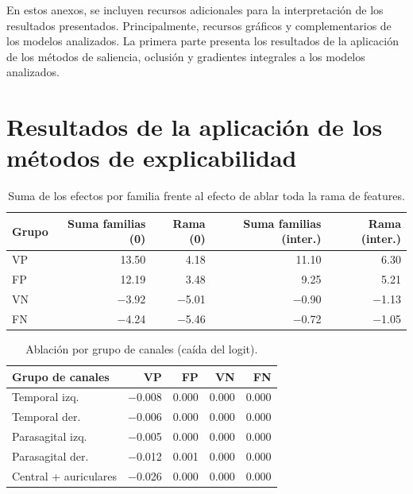 En estos anexos, se incluyen recursos adicionales para la interpretación de los resultados presentados. Principalmente, recursos gráficos y complementarios de los modelos analizados. La primera parte presenta los resultados de la aplicación de los métodos de saliencia, oclusión y gradientes integrales a los modelos analizados.

\section{Resultados de la aplicación de los métodos de explicabilidad}


\begin{table}[htbp]
\centering
\small
\caption{Suma de los efectos por familia frente al efecto de ablar toda la rama de features.}
\label{tab:aditividad}
\begin{tabular}{lrrrr}
\toprule
Grupo & Suma familias (0) & Rama (0) & Suma familias (inter.) & Rama (inter.) \\
\midrule
VP & 13.50 & 4.18 & 11.10 & 6.30 \\
FP & 12.19 & 3.48 & 9.25 & 5.21 \\
VN & $-$3.92 & $-$5.01 & $-$0.90 & $-$1.13 \\
FN & $-$4.24 & $-$5.46 & $-$0.72 & $-$1.05 \\
\bottomrule
\end{tabular}
\end{table}

\begin{table}[htbp]
\centering
\small
\caption{Ablación por grupo de canales (caída del logit).}
\label{tab:canales}
\begin{tabular}{lrrrr}
\toprule
Grupo de canales & VP & FP & VN & FN \\
\midrule
Temporal izq. & $-$0.008 & 0.000 & 0.000 & 0.000 \\
Temporal der. & $-$0.006 & 0.000 & 0.000 & 0.000 \\
Parasagital izq. & $-$0.005 & 0.000 & 0.000 & 0.000 \\
Parasagital der. & $-$0.012 & 0.001 & 0.000 & 0.000 \\
Central + auriculares & $-$0.026 & 0.000 & 0.000 & 0.000 \\
\bottomrule
\end{tabular}
\end{table}

